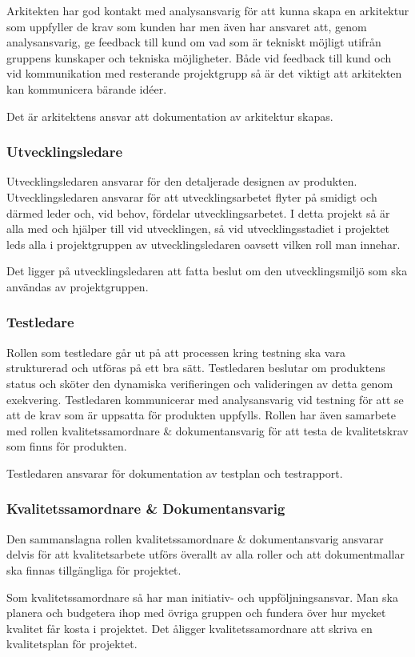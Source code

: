 \documentclass[a4paper,10pt, twoside]{article}
\begin{document}
Arkitekten har god kontakt med analysansvarig för att kunna skapa en arkitektur som uppfyller de krav som kunden har men även har ansvaret att, genom analysansvarig, ge feedback till kund om vad som är tekniskt möjligt utifrån gruppens kunskaper och tekniska möjligheter. Både vid feedback till kund och vid kommunikation med resterande projektgrupp så är det viktigt att arkitekten kan kommunicera bärande idéer.

Det är arkitektens ansvar att dokumentation av arkitektur skapas.
\subsubsection{Utvecklingsledare}
Utvecklingsledaren ansvarar för den detaljerade designen av produkten. Utvecklingsledaren ansvarar för att utvecklingsarbetet flyter på smidigt och därmed leder och, vid behov, fördelar utvecklingsarbetet. I detta projekt så är alla med och hjälper till vid utvecklingen, så vid utvecklingsstadiet i projektet leds alla i projektgruppen av utvecklingsledaren oavsett vilken roll man innehar.

Det ligger på utvecklingsledaren att fatta beslut om den utvecklingsmiljö som ska användas av projektgruppen.
\subsubsection{Testledare}
Rollen som testledare går ut på att processen kring testning ska vara strukturerad och utföras på ett bra sätt. Testledaren beslutar om produktens status och sköter den dynamiska verifieringen och valideringen av detta genom exekvering. Testledaren kommunicerar med analysansvarig vid testning för att se att de krav som är uppsatta för produkten uppfylls. Rollen har även samarbete med rollen kvalitetssamordnare \& dokumentansvarig för att testa de kvalitetskrav som finns för produkten.

Testledaren ansvarar för dokumentation av testplan och testrapport.
\subsubsection{Kvalitetssamordnare \& Dokumentansvarig}
Den sammanslagna rollen kvalitetssamordnare \& dokumentansvarig ansvarar delvis för att kvalitetsarbete utförs överallt av alla roller och att dokumentmallar ska finnas tillgängliga för projektet.

Som kvalitetssamordnare så har man initiativ- och uppföljningsansvar. Man ska planera och budgetera ihop med övriga gruppen och fundera över hur mycket kvalitet får kosta i projektet. Det åligger kvalitetssamordnare att skriva en kvalitetsplan för projektet.
\end{document}
